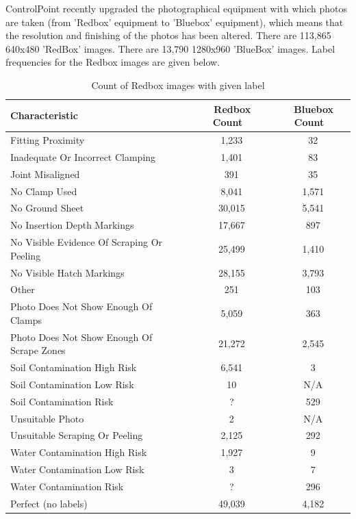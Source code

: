 \documentclass[a4paper,11pt]{article}
\begin{document}
ControlPoint recently upgraded the photographical equipment with which photos are taken (from 'Redbox' equipment to 'Bluebox' equipment), which means that the resolution and finishing of the photos has been altered. There are 113,865 640x480 'RedBox' images. There are 13,790 1280x960 'BlueBox' images. Label frequencies for the Redbox images are given below.

\begin{table}[h!]
   \centering
    \begin{tabular}{|l|c|c|}
    \hline
    Characteristic                              & ~ Redbox Count  & ~ Bluebox Count \\ \hline
    Fitting Proximity                           & ~  1,233        & ~ 32      \\
    Inadequate Or Incorrect Clamping            & ~ 1,401         & ~ 83      \\
    Joint Misaligned                            & ~ 391           & ~ 35      \\
    No Clamp Used                               & ~ 8,041         & ~ 1,571   \\
    No Ground Sheet                             & ~  30,015       & ~ 5,541   \\
    No Insertion Depth Markings                 & ~ 17,667        & ~ 897     \\
    No Visible Evidence Of Scraping Or Peeling  & ~ 25,499        & ~ 1,410   \\
    No Visible Hatch Markings                   & ~ 28,155        & ~ 3,793   \\
    Other                                       & ~  251          & ~ 103     \\
    Photo Does Not Show Enough Of Clamps        & ~ 5,059         & ~ 363     \\
    Photo Does Not Show Enough Of Scrape Zones  & ~ 21,272        & ~ 2,545   \\
    Soil Contamination High Risk                & ~ 6,541         & ~ 3       \\
    Soil Contamination Low Risk                 & ~ 10            & ~ N/A     \\
    Soil Contamination Risk                     & ~ ?             & ~ 529     \\
    Unsuitable Photo                            & ~ 2             & ~ N/A     \\
    Unsuitable Scraping Or Peeling              & ~ 2,125         & ~ 292     \\
    Water Contamination High Risk               & ~ 1,927         & ~ 9       \\
    Water Contamination Low Risk                & ~ 3             & ~ 7       \\
	Water Contamination Risk                    & ~ ?             & ~ 296     \\
     \hline
    Perfect (no labels)                         & ~ 49,039        & ~ 4,182   \\
    \hline
    \end{tabular}
    \caption {Count of Redbox images with given label}
\end{table} 
\end{document}
